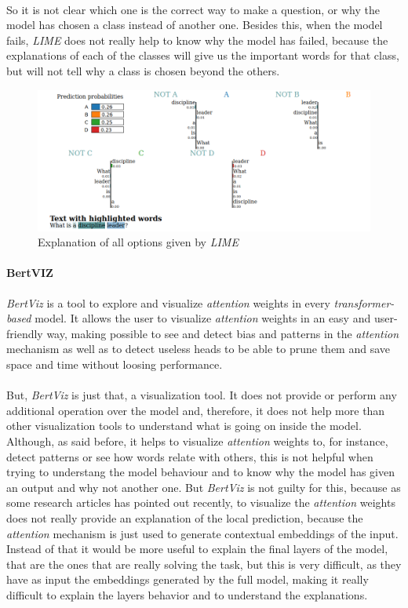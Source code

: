 \paragraph{}
So it is not clear which one is the correct way to make a question, or why the model has chosen a class instead of another one.
Besides this, when the model fails, \emph{LIME} does not really help to know why the model has failed, because the explanations of each of the classes will give us the important words for that class, but will not tell why a class is chosen beyond the others. 
\begin{figure}[!h]
	\centering
	\includegraphics[scale=0.35]{images/conclussionLime}
	\caption{Explanation of all options given by \emph{LIME}}
	\label{fig:conclussionLime}
\end{figure}
\paragraph{BertVIZ} \emph{BertViz} is a tool to explore and visualize \emph{attention} weights in every \emph{transformer-based} model. It allows the user to visualize \emph{attention} weights in an easy and user-friendly way, making possible to see and detect bias and patterns in the \emph{attention} mechanism as well as to detect useless heads to be able to prune them and save space and time without loosing performance.
\paragraph{}
But, \emph{BertViz} is just that, a visualization tool. It does not provide or perform any additional operation over the model and, therefore, it does not help more than other visualization tools to understand what is going on inside the model. Although, as said before, it helps to visualize \emph{attention} weights to, for instance, detect patterns or see how words relate with others, this is not helpful when trying to understang the model behaviour and to know why the model has given an output and why not another one. But \emph{BertViz} is not guilty for this, because as some research articles\cite{} has pointed out recently, to visualize the \emph{attention} weights does not really provide an explanation of the local prediction, because the \emph{attention} mechanism is just used to generate contextual embeddings of the input. Instead of that it would be more useful to explain the final layers of the model, that are the ones that are really solving the task, but this is very difficult, as they have as input the embeddings generated by the full model, making it really difficult to explain the layers behavior and to understand the explanations.
